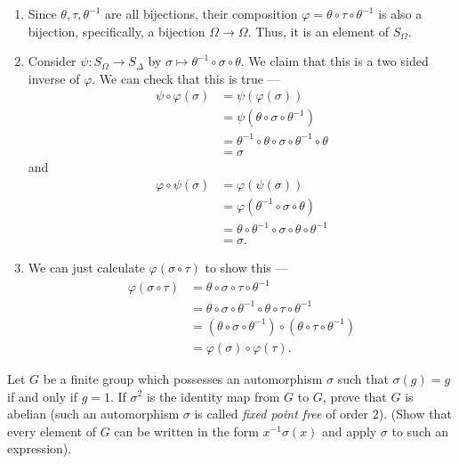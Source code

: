 \documentclass[12 pt, letterpaper]{hmcpset}
\begin{document}
\begin{solution}
	\begin{enumerate}
		\item
			Since $\theta, \tau, \theta^{-1}$ are all bijections, their composition $\varphi = \theta \circ \tau \circ \theta^{-1}$ is also a bijection, specifically, a bijection $\Omega \to \Omega$. Thus, it is an element of $S_\Omega$.
		\item
			Consider $\psi : S_\Omega \to S_\Delta$ by $\sigma \mapsto \theta^{-1} \circ \sigma \circ \theta$. We claim that this is a two sided inverse of $\varphi$. We can check that this is true ---
			\[
				\begin{split}
					\psi \circ \varphi(\sigma) & = \psi(\varphi(\sigma)) \\
								   & = \psi(\theta \circ \sigma \circ \theta^{-1}) \\
								   & = \theta^{-1} \circ \theta \circ \sigma \circ \theta^{-1} \circ \theta \\
								   & = \sigma
				\end{split}
			\]
			and
			\[
				\begin{split}
					\varphi \circ \psi(\sigma) & = \varphi(\psi(\sigma)) \\
								   & = \varphi(\theta^{-1} \circ \sigma \circ \theta) \\
								   & = \theta \circ \theta^{-1} \circ \sigma \circ \theta \circ \theta^{-1} \\
								   & = \sigma.
				\end{split}
			\]
		\item
			We can just calculate $\varphi(\sigma \circ \tau)$ to show this ---
			\[
				\begin{split}
					\varphi(\sigma \circ \tau) & = \theta \circ \sigma \circ \tau \circ \theta^{-1} \\
								   & = \theta \circ \sigma \circ \theta^{-1} \circ \theta \circ \tau \circ \theta^{-1} \\
								   & = (\theta \circ \sigma \circ \theta^{-1}) \circ (\theta \circ \tau \circ \theta^{-1}) \\
								   & = \varphi(\sigma) \circ \varphi(\tau).
				\end{split}
			\]
	\end{enumerate}
\end{solution}

\pagebreak

\begin{problem}
	Let $G$ be a finite group which possesses an automorphism $\sigma$ such that $\sigma(g) = g$ if and only if $g = 1$. If $\sigma^2$ is the identity map from $G$ to $G$, prove that $G$ is abelian (such an automorphism $\sigma$ is called \textit{fixed point free} of order $2$). (Show that every element of $G$ can be written in the form $x^{-1} \sigma(x)$ and apply $\sigma$ to such an expression).
\end{problem}
\end{document}
